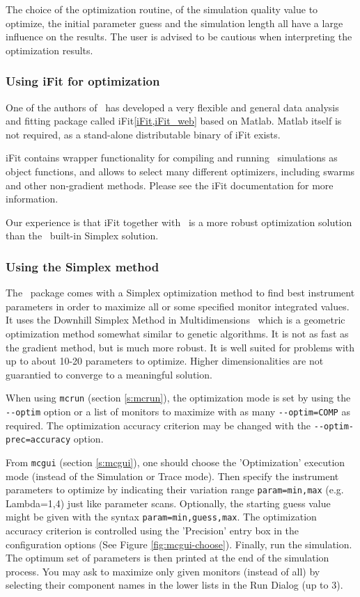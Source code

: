 The choice of the optimization routine, of the simulation quality value to
optimize, the initial parameter guess and the simulation length all have a large
influence on the results.  The user is advised to be cautious when interpreting
the optimization results.

\subsubsection{Using iFit for optimization}

One of the authors of \MCS\ has developed a very flexible and general data
analysis and fitting package called iFit\ref{iFit,iFit_web} based on
Matlab. Matlab itself is not required, as a stand-alone distributable binary of
iFit exists.

iFit contains wrapper functionality for compiling and running \MCS\ simulations
as object functions, and allows to select many different optimizers, including
swarms and other non-gradient methods. Please see the iFit documentation for
more information.

Our experience is that iFit together with \MCS\ is a more robust optimization
solution than the \MCS\ built-in Simplex solution.

\subsubsection{Using the Simplex method}

The \MCS\ package comes with a Simplex optimization method to find best
instrument parameters in order to maximize all or some specified monitor
integrated values. It uses the Downhill Simplex Method in
Multidimensions~\cite{neldermead,NumRecip} which is a geometric optimization
method somewhat similar to genetic algorithms. It is not as fast as the gradient
method, but is much more robust. It is well suited for problems with up to about
10-20 parameters to optimize. Higher dimensionalities are not guarantied to
converge to a meaningful solution.

When using \verb+mcrun+ (section \ref{s:mcrun}), the optimization mode is set by
using the \verb+--optim+ option or a list of monitors to maximize with as many
\verb+--optim=COMP+ as required. The optimization accuracy criterion may be
changed with the \verb+--optim-prec=accuracy+ option.

From \verb+mcgui+ (section \ref{s:mcgui}), one should choose the 'Optimization'
execution mode (instead of the Simulation or Trace mode). Then specify the
instrument parameters to optimize by indicating their variation range
\verb+param=min,max+ (e.g. Lambda=1,4) just like parameter scans. Optionally,
the starting guess value might be given with the syntax
\verb+param=min,guess,max+. The optimization accuracy criterion is controlled
using the 'Precision' entry box in the configuration options (See Figure
\ref{fig:mcgui-choose}). Finally, run the simulation. The optimum set of
parameters is then printed at the end of the simulation process. You may ask to
maximize only given monitors (instead of all) by selecting their component names
in the lower lists in the Run Dialog (up to 3).

